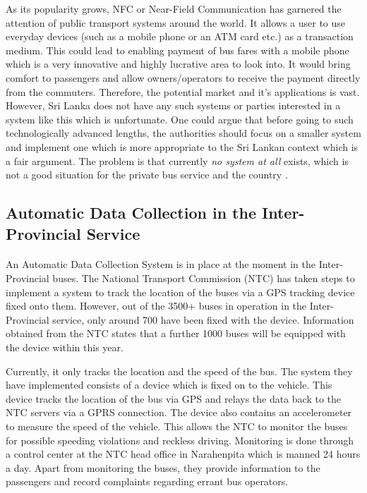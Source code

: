 As its popularity grows, NFC or Near-Field Communication has garnered the attention of public transport systems around the world. It allows a user to use everyday devices (such as a mobile phone or an ATM card etc.) as a transaction medium. This could lead to enabling payment of bus fares with a mobile phone which is a very innovative and highly lucrative area to look into. It would bring comfort to passengers and allow owners/operators to receive the payment directly from the commuters. Therefore, the potential market and it's applications is vast. However, Sri Lanka does not have any such systems or parties interested in a system like this which is unfortunate. One could argue that before going to such technologically advanced lengths, the authorities should focus on a smaller system and implement one which is more appropriate to the Sri Lankan context which is a fair argument. The problem is that currently \textit{no system at all} exists, which is not a good situation for the private bus service and the country \cite{Silva2010, Sinha2012}.

\subsection{Automatic Data Collection in the Inter-Provincial Service} 

\paragraph{ } An Automatic Data Collection System is in place at the moment in the Inter-Provincial buses. The National Transport Commission (NTC) has taken steps to implement a system to track the location of the buses via a GPS tracking device fixed onto them. However, out of the 3500+ buses in operation in the Inter-Provincial service, only around 700 have been fixed with the device. Information obtained from the NTC states that a further 1000 buses will be equipped with the device within this year.

Currently, it only tracks the location and the speed of the bus. The system they have implemented consists of a device which is fixed on to the vehicle. This device tracks the location of the bus via GPS and relays the data back to the NTC servers via a GPRS connection. The device also contains an accelerometer to measure the speed of the vehicle. This allows the NTC to monitor the buses for possible speeding violations and reckless driving. Monitoring is done through a control center at the NTC head office in Narahenpita which is manned 24 hours a day. Apart from monitoring the buses, they provide information to the passengers and record complaints regarding errant bus operators.


